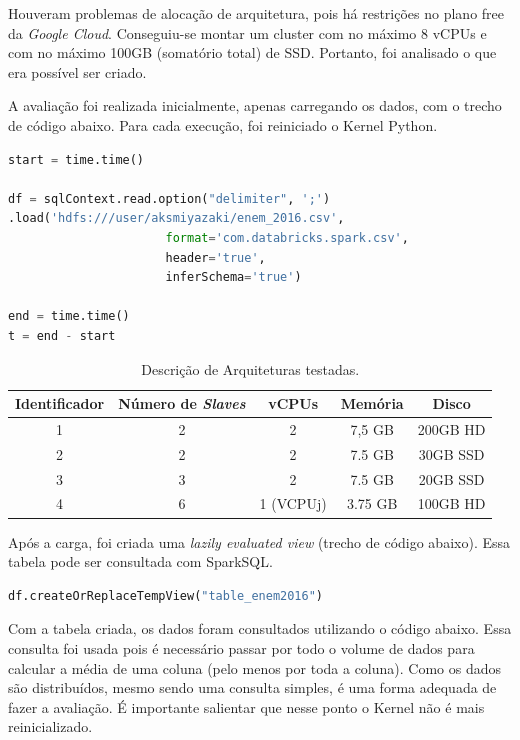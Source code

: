\documentclass{article}
\begin{document}
Houveram problemas de alocação de arquitetura, pois há restrições no plano free da \emph{Google Cloud}. Conseguiu-se montar um cluster com no máximo 8 vCPUs e com no máximo 100GB (somatório total) de SSD. Portanto, foi analisado o que era possível ser criado.

A avaliação foi realizada inicialmente, apenas carregando os dados, com o trecho de código abaixo. Para cada execução, foi reiniciado o Kernel Python.

\begin{lstlisting}[caption= {Carga de dados no Spark},captionpos=b, language=python]
start = time.time()

df = sqlContext.read.option("delimiter", ';')
.load('hdfs:///user/aksmiyazaki/enem_2016.csv', 
                      format='com.databricks.spark.csv', 
                      header='true', 
                      inferSchema='true')

end = time.time()
t = end - start
\end{lstlisting}


\begin{table}[H]
\centering
\begin{tabular}{|c|c|c|c|c|}
\hline
Identificador & Número de \emph{Slaves} & vCPUs &  Memória & Disco \\ \hline \hline
1 & 2 & 2 & 7,5 GB & 200GB HD  \\ \hline
2 & 2 & 2 & 7.5 GB & 30GB SSD \\ \hline
3 & 3 & 2 & 7.5 GB & 20GB SSD \\ \hline
4 & 6 & 1 (VCPUj) & 3.75 GB & 100GB HD   \\ \hline
\end{tabular}
\caption{Descrição de Arquiteturas testadas.}
\label{tab:arqs}
\end{table}

Após a carga, foi criada uma \emph{lazily evaluated view} (trecho de código abaixo). Essa tabela pode ser consultada com SparkSQL. 

\begin{lstlisting}[caption= {Criação da Tabela para Consulta},captionpos=b, language=python]
df.createOrReplaceTempView("table_enem2016")
\end{lstlisting}

Com a tabela criada, os dados foram consultados utilizando o código abaixo. Essa consulta foi usada pois é necessário passar por todo o volume de dados para calcular a média de uma coluna (pelo menos por toda a coluna). Como os dados são distribuídos, mesmo sendo uma consulta simples, é uma forma adequada de fazer a avaliação. É importante salientar que nesse ponto o Kernel não é mais reinicializado.
\end{document}
